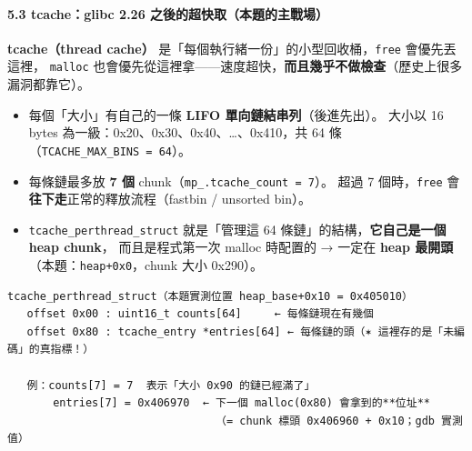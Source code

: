 \documentclass[10pt,a4paper]{article}
\providecommand{\tightlist}{%
  \setlength{\itemsep}{0pt}\setlength{\parskip}{0pt}}
\begin{document}
\paragraph{5.3 tcache：glibc 2.26
之後的超快取（本題的主戰場）}\label{tcacheglibc-2.26-ux4e4bux5f8cux7684ux8d85ux5febux53d6ux672cux984cux7684ux4e3bux6230ux5834}

\textbf{tcache（thread cache）}
是「每個執行緒一份」的小型回收桶，\texttt{free} 會優先丟這裡，
\texttt{malloc}
也會優先從這裡拿------速度超快，\textbf{而且幾乎不做檢查}（歷史上很多漏洞都靠它）。

\begin{itemize}
\tightlist
\item
  每個「大小」有自己的一條 \textbf{LIFO 單向鏈結串列}（後進先出）。
  大小以 16 bytes 為一級：0x20、0x30、0x40、\ldots、0x410，共 64
  條（\texttt{TCACHE\_\allowbreak{}MAX\_\allowbreak{}BINS\ \allowbreak{}=\ \allowbreak{}64}）。
\item
  每條鏈最多放 \textbf{7 個}
  chunk（\texttt{mp\_\allowbreak{}.\allowbreak{}tcache\_\allowbreak{}count\ \allowbreak{}=\ \allowbreak{}7}）。 超過 7
  個時，\texttt{free} 會\textbf{往下走}正常的釋放流程（fastbin /
  unsorted bin）。
\item
  \texttt{tcache\_\allowbreak{}perthread\_\allowbreak{}struct} 就是「管理這 64
  條鏈」的結構，\textbf{它自己是一個 heap chunk}， 而且是程式第一次
  malloc 時配置的 → 一定在 \textbf{heap
  最開頭}（本題：\texttt{heap+0x0}，chunk 大小 0x290）。
\end{itemize}

\begin{Verbatim}[breaklines=true,breakanywhere=true,breakautoindent=false,fontsize=\fontsize{7.0}{9.5}\selectfont]
tcache_perthread_struct（本題實測位置 heap_base+0x10 = 0x405010）
   offset 0x00 : uint16_t counts[64]     ← 每條鏈現在有幾個
   offset 0x80 : tcache_entry *entries[64] ← 每條鏈的頭（✶ 這裡存的是「未編碼」的真指標！）

   例：counts[7] = 7  表示「大小 0x90 的鏈已經滿了」
       entries[7] = 0x406970  ← 下一個 malloc(0x80) 會拿到的**位址**
                                （= chunk 標頭 0x406960 + 0x10；gdb 實測值）
\end{Verbatim}
\end{document}
